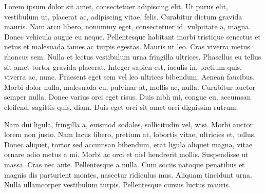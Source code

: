 \documentclass[
	layoutmode=block,
	blockwidth=96mm, blockheight=108mm,
	bleed=0mm,
	bindingoffset=0mm,
	imageblockwidth=0.98, imageblockheight=0.98,
	imageblockoffsettop=0mm,
	12pt,final,openany
]{photobook}
\begin{document}
{\tiny%
	Lorem ipsum dolor sit amet, consectetuer adipiscing elit. Ut purus
	elit, vestibulum ut, placerat ac, adipiscing vitae, felis. Curabitur
	dictum gravida mauris. Nam arcu libero, nonummy eget, consectetuer
	id, vulputate a, magna. Donec vehicula augue eu neque. Pellentesque
	habitant morbi tristique senectus et netus et malesuada fames ac
	turpis egestas. Mauris ut leo. Cras viverra metus rhoncus sem. Nulla et
	lectus vestibulum urna fringilla ultrices. Phasellus eu tellus sit amet
	tortor gravida placerat. Integer sapien est, iaculis in, pretium quis,
	viverra ac, nunc. Praesent eget sem vel leo ultrices bibendum. Aenean
	faucibus. Morbi dolor nulla, malesuada eu, pulvinar at, mollis ac,
	nulla. Curabitur auctor semper nulla. Donec varius orci eget risus.
	Duis nibh mi, congue eu, accumsan eleifend, sagittis quis, diam. Duis
	eget orci sit amet orci dignissim rutrum.

	Nam dui ligula, fringilla a, euismod sodales, sollicitudin vel,
	wisi. Morbi auctor lorem non justo. Nam lacus libero, pretium at, lobortis
	vitae, ultricies et, tellus. Donec aliquet, tortor sed accumsan bibendum,
	erat ligula aliquet magna, vitae ornare odio metus a mi. Morbi ac orci et
	nisl hendrerit mollis. Suspendisse ut massa. Cras nec ante. Pellentesque
	a nulla. Cum sociis natoque penatibus et magnis dis parturient montes,
	nascetur ridiculus mus. Aliquam tincidunt urna. Nulla ullamcorper
	vestibulum turpis. Pellentesque cursus luctus mauris.
	\newpage}


\end{document}
